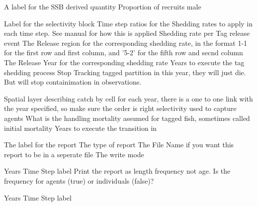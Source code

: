  {A label for the SSB derived quantity}
 {Proportion of recruits male}
 {}
 {}
\par\textbf{}\par
{} {Label for the selectivity block}
 {Time step ratios for the Shedding rates to apply in each time step. See manual for how this is applied}
 {Shedding rate per Tag release event}
 {The Release region for the corresponding shedding rate, in the format 1-1 for the first row and first column, and '5-2' for the fifth row and secnd column}
 {The Release Year for the corresponding shedding rate}
 {Years to execute the tag shedding process}
 {Stop Tracking tagged partition in this year, they will just die. But will stop containimation in observations.}
\par\textbf{}\par
{} {Spatial layer describing catch by cell for each year, there is a one to one link with the year specified, so make sure the order is right}
 {selectivity used to capture agents}
 {What is the handling mortality assumed for tagged fish, sometimes called initial mortality}
 {Years to execute the transition in}
\par\par
{} {The label for the report}
 {The type of report}
 {The File Name if you want this report to be in a seperate file}
 {The write mode}
\par\textbf{}\par
{} {Years}
 {Time Step label}
 {Print the report as length frequency not age.}
 {Is the frequency for agents (true) or individuals (false)?}
\par\textbf{}\par
{} {Years}
 {Time Step label}
\par\textbf{}\par
